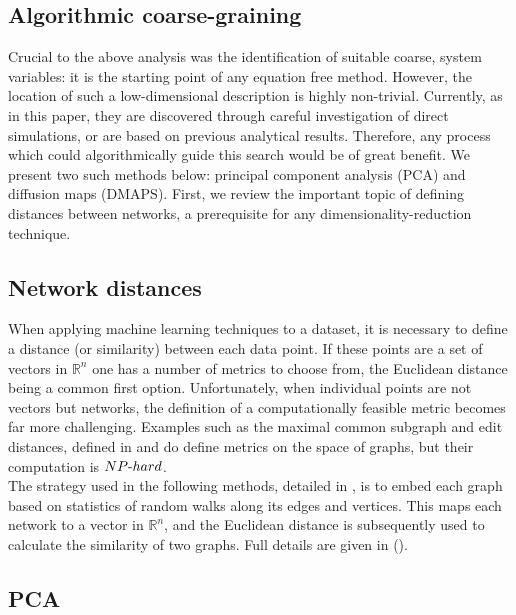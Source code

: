 \documentclass[epjST, final]{svjour}
\begin{document}
\begin{onehalfspace}
\section{Algorithmic coarse-graining}
\label{sec:dr}
Crucial to the above analysis was the identification of suitable coarse, system variables: it is the starting point of any equation free method. However, the location of such a low-dimensional description is highly non-trivial. Currently, as in this paper, they are discovered through careful investigation of direct simulations, or are based on previous analytical results. Therefore, any process which could algorithmically guide this search would be of great benefit. We present two such methods below: principal component analysis (PCA) and diffusion maps (DMAPS). First, we review the important topic of defining distances between networks, a prerequisite for any dimensionality-reduction technique.

\subsection{Network distances}

When applying machine learning techniques to a dataset, it is necessary to define a distance (or similarity) between each data point. If these points are a set of vectors in $\mathbb{R}^n$ one has a number of metrics to choose from, the Euclidean distance being a common first option. Unfortunately, when individual points are not vectors but networks, the definition of a computationally feasible metric becomes far more challenging. Examples such as the maximal common subgraph and edit distances, defined in \cite{bunke_graph_1998} and \cite{gao_survey_2010} do define metrics on the space of graphs, but their computation is $NP\textnormal{-}hard$. \\

The strategy used in the following methods, detailed in \cite{rajendran_analysis_2013}, is to embed each graph based on statistics of random walks along its edges and vertices. This maps each network to a vector in $\mathbb{R}^n$, and the Euclidean distance is subsequently used to calculate the similarity of two graphs. Full details are given in (\cite{rajendran_analysis_2013}).

\subsection{PCA}



\end{onehalfspace}
\end{document}
